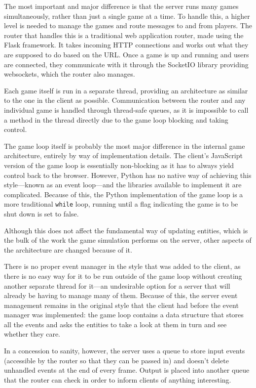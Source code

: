 The most important and major difference is that the server runs many games simultaneously, rather than just a single game at a time. To handle this, a higher level is needed to manage the games and route messages to and from players. The router that handles this is a traditional web application router, made using the Flask framework. It takes incoming HTTP connections and works out what they are supposed to do based on the URL. Once a game is up and running and users are connected, they communicate with it through the SocketIO library providing websockets, which the router also manages.

Each game itself is run in a separate thread, providing an architecture as similar to the one in the client as possible. Communication between the router and any individual game is handled through thread-safe queues, as it is impossible to call a method in the thread directly due to the game loop blocking and taking control.

The game loop itself is probably the most major difference in the internal game architecture, entirely by way of implementation details. The client's JavaScript version of the game loop is essentially non-blocking as it has to always yield control back to the browser. However, Python has no native way of achieving this style---known as an event loop---and the libraries available to implement it are complicated. Because of this, the Python implementation of the game loop is a more traditional \texttt{while} loop, running until a flag indicating the game is to be shut down is set to false.

Although this does not affect the fundamental way of updating entities, which is the bulk of the work the game simulation performs on the server, other aspects of the architecture are changed because of it.

There is no proper event manager in the style that was added to the client, as there is no easy way for it to be run outside of the game loop without creating another separate thread for it---an undesirable option for a server that will already be having to manage many of them. Because of this, the server event management remains in the original style that the client had before the event manager was implemented: the game loop contains a data structure that stores all the events and asks the entities to take a look at them in turn and see whether they care.

In a concession to sanity, however, the server uses a queue to store input events (accessible by the router so that they can be passed in) and doesn't delete unhandled events at the end of every frame. Output is placed into another queue that the router can check in order to inform clients of anything interesting.

